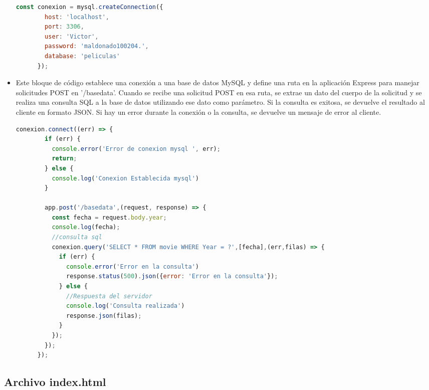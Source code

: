\documentclass{article}
\begin{document}
\begin{itemize}
\begin{lstlisting}[language=JavaScript,caption=conexion mySQL,firstnumber=20]
      const conexion = mysql.createConnection({
        host: 'localhost',
        port: 3306,
        user: 'Victor',
        password: 'maldonado100204.',
        database: 'peliculas'
      });
    \end{lstlisting}
    \item Este bloque de código establece una conexión a una base de datos MySQL y define una ruta en la aplicación 
      Express para manejar solicitudes POST en '/basedata'. \newline Cuando se recibe una solicitud POST en esa ruta, se extrae 
      un dato del cuerpo de la solicitud y se realiza una consulta SQL a la base de datos utilizando ese dato como parámetro. 
      Si la consulta es exitosa, se devuelve el resultado al cliente en formato JSON. Si hay un error durante la conexión o la 
      consulta, se devuelve un mensaje de error al cliente.
    \begin{lstlisting}[language=JavaScript,caption=consulta mySQL,firstnumber=28]
      conexion.connect((err) => {
        if (err) {
          console.error('Error de conexion mysql ', err);
          return;
        } else {
          console.log('Conexion Establecida mysql')
        }
        
        app.post('/basedata',(request, response) => {
          const fecha = request.body.year;
          console.log(fecha);
          //consulta sql
          conexion.query('SELECT * FROM movie WHERE Year = ?',[fecha],(err,filas) => {
            if (err) {
              console.error('Error en la consulta')
              response.status(500).json({error: 'Error en la consulta'});
            } else {
              //Respuesta del servidor
              console.log('Consulta realizada')
              response.json(filas);
            }
          });
        });
      });
    \end{lstlisting}
  \end{itemize}
  

  \subsection{Archivo index.html}
  
\end{document}
